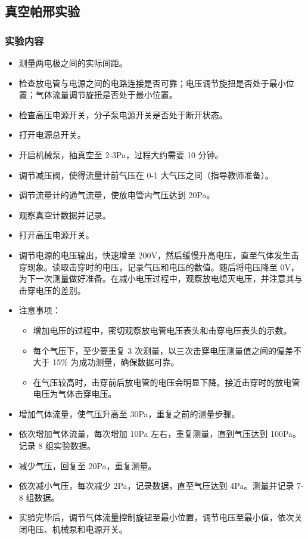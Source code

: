 \documentclass[dvipsnames, svgnames,a4paper,11pt]{article}
\begin{document}
		
		
\subsection{真空帕邢实验}
\subsubsection{实验内容}
\begin{itemize}
    \item 测量两电极之间的实际间距。
    \item 检查放电管与电源之间的电路连接是否可靠；电压调节旋扭是否处于最小位置；气体流量调节旋扭是否处于最小位置。
    \item 检查高压电源开关，分子泵电源开关是否处于断开状态。
    \item 打开电源总开关。
    \item 开启机械泵，抽真空至 2-3Pa，过程大约需要 10 分钟。
    \item 调节减压阀，使得流量计前气压在 0-1 大气压之间（指导教师准备）。
    \item 调节流量计的通气流量，使放电管内气压达到 20Pa。
    \item 观察真空计数据并记录。
    \item 打开高压电源开关。
    \item 调节电源的电压输出，快速增至 200V，然后缓慢升高电压，直至气体发生击穿现象。读取击穿时的电压，记录气压和电压的数值。随后将电压降至 0V，为下一次测量做好准备。在减小电压过程中，观察放电熄灭电压，并注意其与击穿电压的差别。
    \item 注意事项：
        \begin{itemize}
            \item 增加电压的过程中，密切观察放电管电压表头和击穿电压表头的示数。
            \item 每个气压下，至少要重复 3 次测量，以三次击穿电压测量值之间的偏差不大于 15\% 为成功测量，确保数据可靠。
            \item 在气压较高时，击穿前后放电管的电压会明显下降。接近击穿时的放电管电压为气体击穿电压。
        \end{itemize}
    \item 增加气体流量，使气压升高至 30Pa，重复之前的测量步骤。
    \item 依次增加气体流量，每次增加 10Pa 左右，重复测量，直到气压达到 100Pa。记录 8 组实验数据。
    \item 减少气压，回复至 20Pa，重复测量。
    \item 依次减小气压，每次减少 2Pa，记录数据，直至气压达到 4Pa。测量并记录 7-8 组数据。
    \item 实验完毕后，调节气体流量控制旋钮至最小位置，调节电压至最小值，依次关闭电压、机械泵和电源开关。
\end{itemize}
\end{document}

